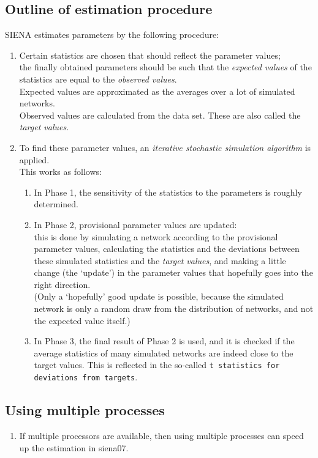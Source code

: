 \documentclass[a4paper,fleqn]{article}
\newcommand{\+}{\, + \,}
\newcommand{\sfn}[1]{\textsf{#1}}
\newcommand{\SI}{{\sf SIENA }}
\begin{document}
{\subsection{Outline of estimation procedure}
\noindent
\SI estimates parameters by the following procedure:
\begin{enumerate}
\item  Certain statistics are chosen that should reflect the parameter values;\\
  the finally obtained parameters should be such that the \emph{expected
    values}
  of the statistics are equal to the \emph{observed values}.\\
  Expected values are approximated as the averages over a lot of simulated
  networks.\\
  Observed values are calculated from the data set. These are also called the
  \emph{target values}.
\item To find these parameter values, an \emph{iterative stochastic simulation
    algorithm}
  is applied.\\
  This works as follows:
\begin{enumerate}
\item In Phase 1, the sensitivity of the statistics to the parameters is roughly
  determined.
\item In Phase 2, provisional parameter values are updated:\\
  this is done by simulating a network according to the provisional parameter
  values, calculating the statistics and the deviations between these simulated
  statistics and the \emph{target values}, and making a little change (the
  `update') in the parameter values
  that hopefully goes into the right direction.\\
  (Only a `hopefully' good update is possible, because the simulated network is
  only a random draw from the distribution of networks, and not the expected
  value itself.)
\item In Phase 3, the final result of Phase 2 is used, and it is checked if the
  average statistics of many simulated networks are indeed close to the target
  values. This is reflected in the so-called \texttt{t statistics for deviations
    from targets}.
\end{enumerate}
\end{enumerate}

\subsection{Using multiple processes}
\label{S_multipleProcesses}
\begin{enumerate}
\item
If multiple processors are available, then using
multiple processes can speed up the estimation in \sfn{siena07}.


\end{enumerate}}
\end{document}
